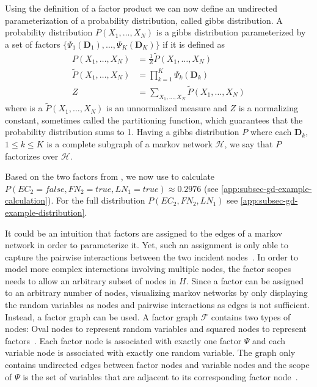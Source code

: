 \bigskip

Using the definition of a \gls{factor product} we can now define an undirected parameterization of a \gls{probability distribution}, called \gls{gibbs distribution}.
A \gls{probability distribution} $P(X_1,\dots,X_N)$ is a \gls{gibbs distribution} parameterized by a set of \glspl{factor} $\{\Psi_1(\mathbf{D}_1),\dots,\Psi_K(\mathbf{D}_K)\}$ if it is defined as~\citep{koller2009probabilistic}
\begin{equation}
  \label{equ:gibbs-distribution}
  \begin{split}
  P\left(X_1,\dots,X_N\right) & =\frac{1}{Z}\tilde{P}\left(X_1,\dots,X_N\right) \\
  \tilde{P}\left(X_1,\dots,X_N\right) & =\prod_{k=1}^{K}\Psi_k\left(\mathbf{D}_k\right) \\
  Z & =\sum_{X_1,\ldots,X_N}\tilde{P}\left(X_1,\dots,X_N\right)
  \end{split}
\end{equation}
where is a $\tilde{P}(X_1,\dots,X_N)$ is an unnormalized measure and $Z$ is a normalizing constant, sometimes called the \gls{partitioning function}, which guarantees that the \gls{probability distribution} sums to 1.
Having a \gls{gibbs distribution} $P$ where each $\mathbf{D}_k$, $1\leq k \leq K$ is a complete subgraph of a \gls{markov network} $\mathcal{H}$, we say that $P$ factorizes over $\mathcal{H}$.~\citep{koller2009probabilistic}

Based on the two \glspl{factor} from , we now use  to calculate $P(EC_2=false,FN_2=true,LN_1=true)\approx 0.2976$ (see \cref{app:subsec-gd-example-calculation}).
For the full distribution $P(EC_2,FN_2,LN_1)$ see \cref{app:subsec-gd-example-distribution}.

\bigskip

It could be an intuition that \glspl{factor} are assigned to the edges of a \gls{markov network} in order to parameterize it.
Yet, such an assignment is only able to capture the pairwise interactions between the two incident nodes~\citep{koller2009probabilistic}.
In order to model more complex interactions involving multiple nodes, the \glspl{factor scope} needs to allow an arbitrary subset of nodes in $H$.
Since a factor can be assigned to an arbitrary number of nodes, visualizing \glspl{markov network} by only displaying the random variables as nodes and pairwise interactions as edges is not sufficient.
Instead, a \gls{factor graph} can be used.
A \gls{factor graph} $\mathcal{F}$ contains two types of \glspl{node}: Oval \glspl{node} to represent \glspl{random variable} and squared \glspl{node} to represent \glspl{factor}~\citep{koller2009probabilistic}.
Each factor node is associated with exactly one \gls{factor} $\Psi$ and each variable node is associated with exactly one \gls{random variable}.
The graph only contains undirected edges between factor nodes and variable nodes and the scope of $\Psi$ is the set of variables that are adjacent to its corresponding factor node~\citep{koller2009probabilistic}.

